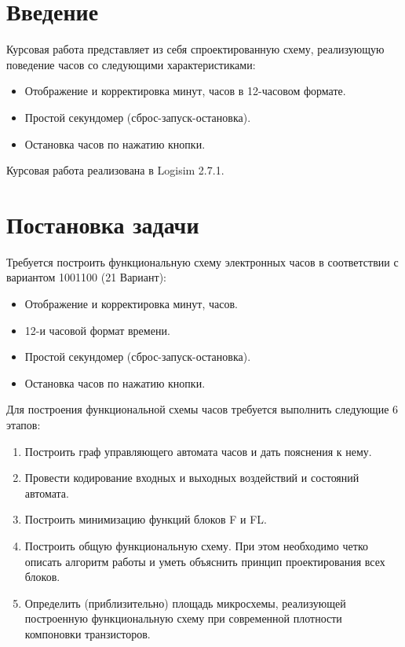 \documentclass[11pt,a4paper,final]{article} %
\begin{document}
\newpage

\tableofcontents

\newpage
\section* {Введение}
Курсовая работа представляет из себя спроектированную схему, реализующую поведение часов со следующими характеристиками:
\begin{itemize}
	\item Отображение и корректировка минут, часов в 12-часовом формате.
	\item Простой секундомер (сброс-запуск-остановка).
	\item Остановка часов по нажатию кнопки.
\end{itemize}
\par Курсовая работа реализована в Logisim 2.7.1.


\newpage
\section{Постановка задачи}
Требуется построить функциональную схему электронных часов в соответствии с вариантом 1001100 (21 Вариант):
\begin{itemize}
	\item Отображение и корректировка минут, часов. 
	\item 12-и часовой формат времени.
	\item Простой секундомер (сброс-запуск-остановка).
	\item Остановка часов по нажатию кнопки.
\end{itemize}
Для построения функциональной схемы часов требуется выполнить следующие 6 этапов:
\begin{enumerate}
	\item Построить граф управляющего автомата часов и дать пояснения к нему. 
	\item Провести кодирование входных и выходных воздействий и состояний автомата.
	\item Построить минимизацию функций блоков F и FL.
	\item Построить общую функциональную схему. При этом необходимо четко описать алгоритм работы и уметь
	объяснить принцип проектирования всех блоков.
	\item Определить (приблизительно) площадь микросхемы, реализующей построенную функциональную схему
	при современной плотности компоновки транзисторов.
\end{enumerate}
\end{document}
